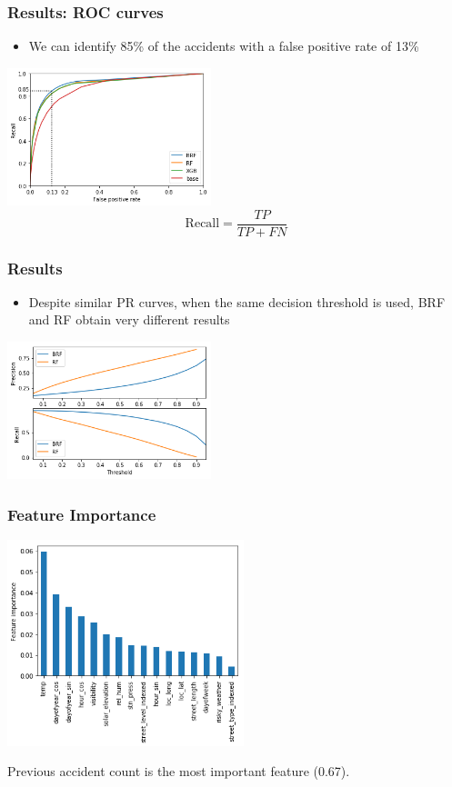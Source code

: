 \documentclass[slidestop,compress,red,mathserif]{beamer}
\begin{document}
\begin{frame}
	\frametitle{Results: ROC curves}
	\begin{itemize}
     \item We can identify 85\% of the accidents with a false positive rate of 13\%
	\end{itemize}
\centering
\includegraphics[height=4cm, keepaspectratio]{Figures/roc.png}
\begin{equation*}
  \mathrm{Recall} = \frac{TP}{TP+FN}
\end{equation*}
\end{frame}

\begin{frame}
	\frametitle{Results}
	\begin{itemize}
		\item Despite similar PR curves, when the same decision threshold is used, BRF and RF obtain very different results 
	\end{itemize}
\centering
\includegraphics[height=4cm, keepaspectratio]{Figures/pr_threshold.png}
\end{frame}

\begin{frame}
	\frametitle{Feature Importance}
\centering
\includegraphics[height=6cm, keepaspectratio]{Figures/features.png}

Previous accident count is the most important feature (0.67).
\end{frame}
\end{document}

